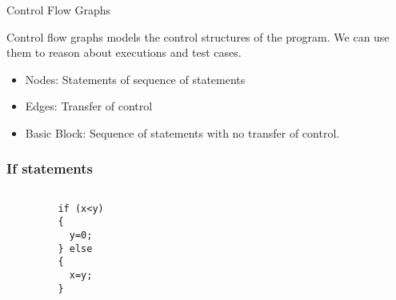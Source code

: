 \documentclass{beamer}
\begin{document}
 \begin{frame}{Control Flow Graphs}

Control flow graphs models the control structures of the program. We
can use them to reason about executions and test cases.
\begin{itemize}
\item Nodes: Statements of sequence of statements
\item Edges: Transfer of control
\item Basic Block: Sequence of statements with no transfer of control.
\end{itemize}
\end{frame}


\begin{frame}[fragile]%
\frametitle{If statements}
\begin{columns}
\begin{column}{0.5\textwidth}
\begin{lstlisting}
         if (x<y) 
         { 
           y=0; 
         } else
         {
           x=y;
         }
\end{lstlisting}
\end{column}
\begin{column}{0.5\textwidth}
\end{column}
\end{columns}
\end{frame}
\end{document}
